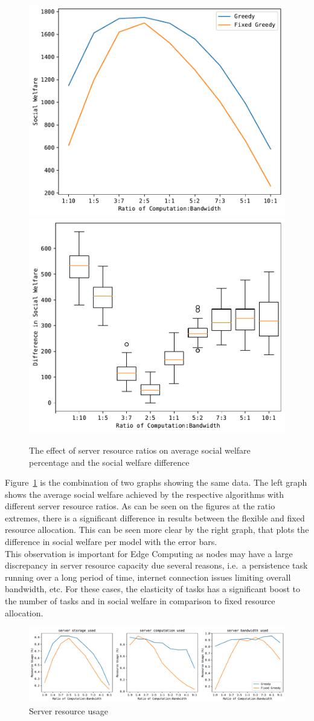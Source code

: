 \begin{figure}[h]
    \centering
    \includegraphics[width=0.45\linewidth]{figs/resource_ratio/social_welfare.pdf}
    \includegraphics[width=0.45\linewidth]{figs/resource_ratio/social_welfare_difference.pdf}
    \caption{The effect of server resource ratios on average social welfare percentage and the social welfare difference}
    \label{fig:resource-ratio-social-welfare}
\end{figure}

Figure~\ref{fig:resource-ratio-social-welfare} is the combination of two graphs showing the same data. The left graph
shows the average social welfare achieved by the respective algorithms with different server resource ratios. As can be
seen on the figures at the ratio extremes, there is a significant difference in results between the flexible and fixed
resource allocation. This can be seen more clear by the right graph, that plots the difference in social welfare per
model with the error bars. \\
This observation is important for Edge Computing as nodes may have a large discrepancy in server resource capacity
due several reasons, i.e.\ a persistence task running over a long period of time, internet connection issues limiting
overall bandwidth, etc. For these cases, the elasticity of tasks has a significant boost to the number of tasks and
in social welfare in comparison to fixed resource allocation.

\begin{figure}[h]
    \centering
    \includegraphics[width=\linewidth]{figs/resource_ratio/server_resource_usage.pdf}
    \caption{Server resource usage}
    \label{fig:resource-ratio-server-resource-usage}
\end{figure}


